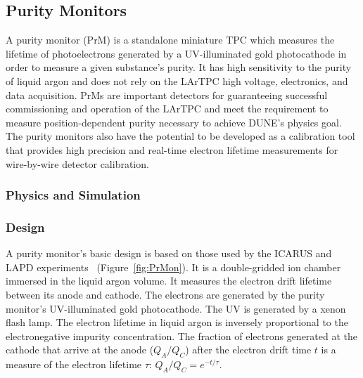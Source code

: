 \subsection{Purity Monitors}
\label{sec:fdsp-slow-cryo-purity-mon}
A purity monitor (PrM) is a standalone miniature TPC which measures the lifetime of photoelectrons generated by a UV-illuminated gold photocathode in order to measure a given substance's purity. It has high sensitivity to the purity of liquid argon and does not rely on the LArTPC high voltage, electronics, and data acquisition. PrMs are important detectors for guaranteeing successful commissioning and operation of the LArTPC and meet the requirement to measure position-dependent purity necessary to achieve DUNE's physics goal. The purity monitors also have the potential to be developed as a calibration tool that provides high precision and real-time electron lifetime measurements for wire-by-wire detector calibration. 


\subsubsection{Physics and Simulation}


\subsubsection{Design}
A purity monitor's basic design is based on those used by the ICARUS and LAPD experiments~\cite{Carugno:1990kd, Adamowski:2014daa} (Figure~\ref{fig:PrMon}). It is a double-gridded ion chamber immersed in the liquid argon volume. It measures the electron drift lifetime between its anode and cathode. The electrons are generated by the purity monitor's UV-illuminated gold photocathode. The UV is generated by a xenon flash lamp. The electron lifetime in liquid argon is inversely proportional to the electronegative impurity concentration. The fraction of electrons generated at the cathode that arrive at the anode ($Q_A/Q_C$) after the electron drift time $t$ is a measure of the electron lifetime $\tau$: $Q_A/Q_C=e^{-t/\tau}$. 



